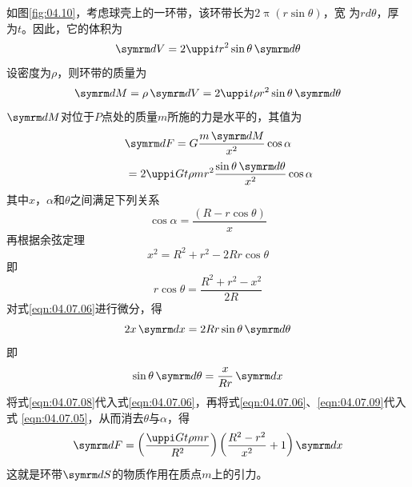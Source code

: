 如图\ref{fig:04.10}，考虑球壳上的一环带，该环带长为$ 2 \uppi ( r \sin \theta ) $，宽
为$ r d \theta $，厚为$ t $。因此，它的体积为
\begin{equation*}
 \dif V = 2 \uppi t r ^ { 2 } \sin \theta \dif \theta
\end{equation*}
设密度为$ \rho $，则环带的质量为
\begin{equation*}
 \dif M = \rho \dif V = 2 \uppi t \rho r ^ { 2 } \sin \theta \dif \theta
\end{equation*}
$ \dif M $对位于$ P $点处的质量$ m $所施的力是水平的，其值为
\begin{equation*}
        \dif F = G \frac { m \dif M } { x ^ { 2 } } \cos \alpha \\
\end{equation*}
\begin{equation}\label{eqn:04.07.05}
        \mbox{} \qquad = 2 \uppi G t \rho m r ^ { 2 } \frac { \sin \theta \dif \theta } { x ^ { 2 } } \cos \alpha
\end{equation}
其中$ x $，$ \alpha $和$ \theta $之间满足下列关系
\begin{equation}\label{eqn:04.07.06}
 \cos \alpha = \frac { ( R - r \cos \theta ) } { x }
\end{equation}
再根据余弦定理
\begin{equation}\label{eqn:04.07.07}
 x ^ { 2 } = R ^ { 2 } + r ^ { 2 } - 2 R r \cos \theta
\end{equation}
即
\begin{equation}\label{eqn:04.07.08}
 r \cos \theta = \frac { R ^ { 2 } + r ^ { 2 } - x ^ { 2 } } { 2 R }
\end{equation}
对式\eqref{eqn:04.07.06}进行微分，得
\begin{equation*}
 2 x \dif x = 2 R r \sin \theta \dif \theta
\end{equation*}
即
\begin{equation}\label{eqn:04.07.09}
 \sin \theta \dif \theta = \frac { x } { R r } \dif x
\end{equation}
将式\eqref{eqn:04.07.08}代入式\eqref{eqn:04.07.06}，再将式\eqref{eqn:04.07.06}、\eqref{eqn:04.07.09}代入式
\eqref{eqn:04.07.05}，从而消去$ \theta $与$ \alpha $，得
\begin{equation}\label{eqn:04.07.10}
 \dif F = \left( \frac { \uppi G t \rho m r } { R ^ { 2 } } \right) \left( \frac { R ^ { 2 } - r ^ { 2 } } { x ^ { 2 } } + 1 \right) \dif x
\end{equation}
这就是环带$ \dif S $的物质作用在质点$ m $上的引力。

